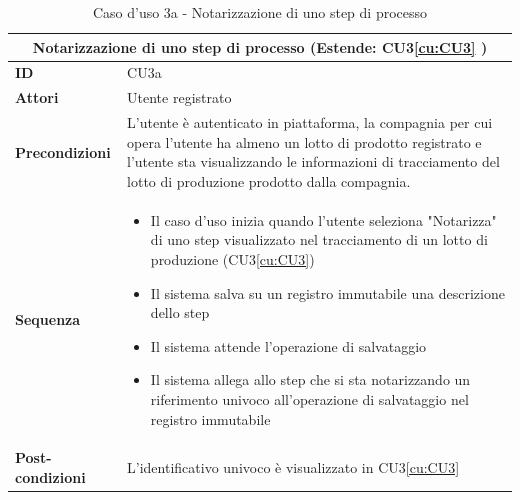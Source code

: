 \documentclass[a4paper,11pt]{article}
\begin{document}
\begin{table}[H]
  \centering
  \begin{tabular}{|m{2cm}|m{10.5cm}|}
    \hline
    \multicolumn{2}{|c|}{\textbf{ Notarizzazione di uno step di processo (Estende: CU3\ref{cu:CU3} )}}                                                                                                                                                                                   \\ \hline
    \multicolumn{1}{|l|}{\textbf{ID}}              & CU3a                                                                                                                                                                                                                                \\ \hline
    \multicolumn{1}{|l|}{\textbf{Attori}}          & Utente registrato                                                                                                                                                                                                                   \\ \hline
    \multicolumn{1}{|l|}{\textbf{Precondizioni}}   & L'utente è autenticato in piattaforma, la compagnia per cui opera l'utente ha almeno un lotto di prodotto registrato e l'utente sta visualizzando le informazioni di tracciamento del lotto di produzione prodotto dalla compagnia. \\ \hline
    \multicolumn{1}{|l|}{\textbf{Sequenza}}        &
    \begin{itemize}

      \item Il caso d'uso inizia quando l'utente seleziona "Notarizza" di uno step visualizzato nel tracciamento di un lotto di produzione (CU3\ref{cu:CU3})
      \item Il sistema salva su un registro immutabile una descrizione dello step
      \item Il sistema attende l'operazione di salvataggio
      \item Il sistema allega allo step che si sta notarizzando un riferimento univoco all'operazione di salvataggio nel registro immutabile

    \end{itemize}
    \\ \hline
    \multicolumn{1}{|l|}{\textbf{Post-condizioni}} & L'identificativo univoco è visualizzato in CU3\ref{cu:CU3}                                                                                                                                                                          \\ \hline
  \end{tabular}
  \caption{Caso d'uso 3a - Notarizzazione di uno step di processo}
  \label{cu:CU3a}
\end{table}
\end{document}
